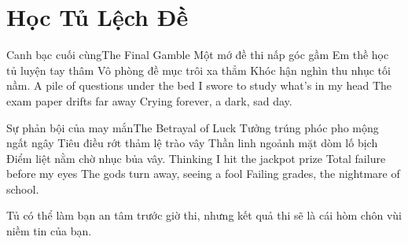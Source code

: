 \chapter{Học Tủ Lệch Đề}

\begin{tutuyetbox}{Canh bạc cuối cùng}{The Final Gamble}
Một mớ đề thi nấp góc gầm
Em thề học tủ luyện tay thâm
Vô phòng đề mục trôi xa thẳm
Khóc hận nghìn thu nhục tối nầm.
\tcblower
A pile of questions under the bed 
I swore to study what's in my head 
The exam paper drifts far away 
Crying forever, a dark, sad day.
\end{tutuyetbox}

\begin{tutuyetbox}{Sự phản bội của may mắn}{The Betrayal of Luck}
Tưởng trúng phóc pho mộng ngất ngây
Tiêu điều rớt thảm lệ trào vây
Thần linh ngoảnh mặt dòm lố bịch
Điểm liệt nằm chờ nhục bủa vây.
\tcblower
Thinking I hit the jackpot prize 
Total failure before my eyes 
The gods turn away, seeing a fool 
Failing grades, the nightmare of school.
\end{tutuyetbox}

\begin{ghichu}
Tủ có thể làm bạn an tâm trước giờ thi, nhưng kết quả thi sẽ là cái hòm chôn vùi niềm tin của bạn.
\end{ghichu}
